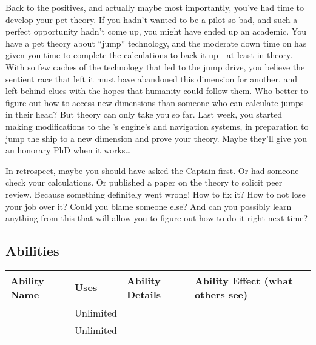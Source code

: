 \documentclass[char]{TMFHope}
\begin{document}
Back to the positives, and actually maybe most importantly, you've had time to develop your pet theory. If you hadn't wanted to be a pilot so bad, and such a perfect opportunity hadn't come up, you might have ended up an academic. You have a pet theory about ``jump'' technology, and the moderate down time on \pNew{} has given you time to complete the calculations to back it up - at least in theory. With so few caches of the technology that led to the jump drive, you believe the sentient race that left it must have abandoned this dimension for another, and left behind clues with the hopes that humanity could follow them. Who better to figure out how to access new dimensions than someone who can calculate jumps in their head? But theory can only take you so far. Last week, you started making modifications to the \pNew{}'s engine's and navigation systems, in preparation to jump the ship to a new dimension and prove your theory. Maybe they'll give you an honorary PhD when it works\ldots

In retrospect, maybe you should have asked the Captain first. Or had someone check your calculations. Or published a paper on the theory to solicit peer review. Because something definitely went wrong! How to fix it? How to not lose your job over it? Could you blame someone else? And can you possibly learn anything from this that will allow you to figure out how to do it right next time?

\subsection*{Abilities}
\begin{tabular}{|p{3cm}|p{1.5cm}|p{8.5cm}|p{3cm}|} 
 \hline
 \textbf{Ability Name} & \textbf{Uses} & \textbf{Ability Details} & \textbf{Ability Effect (what others see)} \\ 
\hline 
 \aCalculate{\MYname} & Unlimited & \aCalculate{\MYtext} & \aCalculate{\MYeffect} \\
\hline 
 \aInvestigate{\MYname} & Unlimited & \aInvestigate{\MYtext} & \aInvestigate{\MYeffect} \\
 \hline
\end{tabular}
\end{document}
